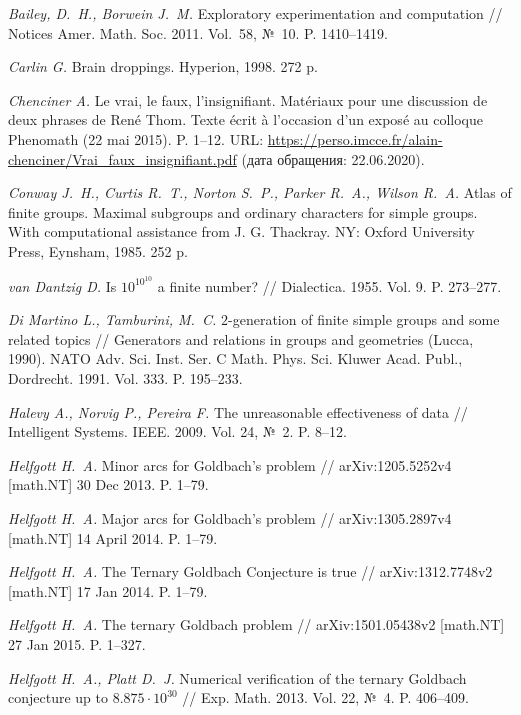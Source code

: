 \documentclass[intlimits,twoside,a4paper,11pt]{article}
\begin{document}
\begin{thebibliography}{99}
{	 {\it  Bailey, D.~H., Borwein J.~M.\/} Exploratory experimentation 
	and computation // Notices Amer. Math. Soc. 2011. Vol.~58, №~10. P. 1410--1419. 
	
	 {\it Carlin G.\/} Brain droppings. Hyperion, 1998. 272 p.
	
	 {\it Chenciner A.\/} Le vrai, le faux, l’insignifiant.
	Mat\'eriaux pour une discussion de deux phrases de Ren\'e Thom.
	Texte \'ecrit à l'occasion d'un expos\'e au colloque Phenomath (22 mai 2015). P. 1--12.
	URL: \url{https://perso.imcce.fr/alain-chenciner/Vrai\_faux\_insignifiant.pdf} (дата обращения: 22.06.2020).
	
	 {\it Conway J.~H., Curtis R.~T., Norton S.~P., Parker R.~A., 
		Wilson R.~A.\/} Atlas of finite groups. Maximal subgroups and ordinary characters 
	for simple groups. With computational assistance from J. G. Thackray. NY: Oxford University Press, Eynsham, 1985. 252 p.
	
	 {\it van Dantzig D.\/} Is $10^{10^{10}}$ a finite number? //
	Dialectica. 1955. Vol. 9. P. 273--277. 
	
	 {\it Di Martino L., Tamburini, M.~C.\/} $2$-generation of finite simple groups 
	and some related topics // Generators and relations in groups and geometries (Lucca, 1990). 
	NATO Adv. Sci. Inst. Ser. C Math. Phys. Sci. Kluwer Acad. Publ., 
	Dordrecht. 1991. Vol. 333. P. 195--233.
	
	 {\it Halevy A., Norvig P., Pereira F.} The unreasonable effectiveness of data //
	Intelligent Systems. IEEE. 2009. Vol. 24, №~2. P. 8--12.
	
	 {\it Helfgott H.~A.\/} Minor arcs for Goldbach's problem //
	arXiv:1205.5252v4  [math.NT]  30 Dec 2013. P. 1--79.
	
	 {\it Helfgott H.~A.\/} Major arcs for Goldbach’s problem //
	arXiv:1305.2897v4 [math.NT] 14 April 2014. P. 1--79.
	
	 {\it Helfgott H.~A.\/} The Ternary Goldbach Conjecture is true //
	arXiv:1312.7748v2  [math.NT]  17 Jan 2014. P. 1--79.
	
	 {\it Helfgott H.~A.\/} The ternary Goldbach problem // 
	arXiv:1501.05438v2  [math.NT]  27 Jan 2015. P. 1--327.
	
	 {\it Helfgott H.~A., Platt D.~J.\/} Numerical verification of the ternary 
	Goldbach conjecture up to $8.875\cdot 10^{30}$ //
	Exp. Math. 2013. Vol. 22, №~4. P. 406--409.
	
}
\end{thebibliography}
\end{document}
